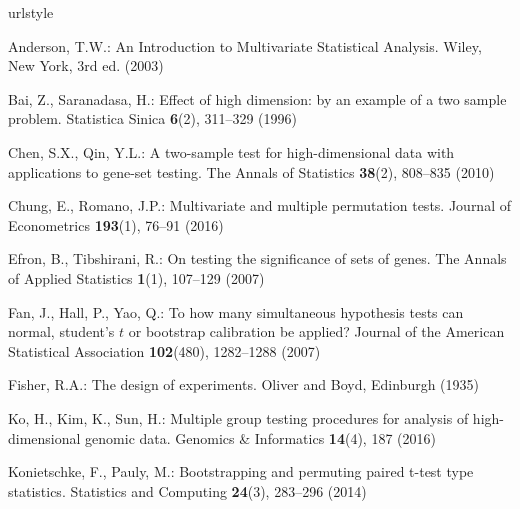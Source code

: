 \documentclass[smallcondensed,final,natbib]{svjour3}          %
\begin{document}
\begin{thebibliography}{16}
\providecommand{\natexlab}[1]{#1}
\providecommand{\url}[1]{\texttt{#1}}
\providecommand{\urlprefix}{URL }
\expandafter\ifx\csname urlstyle\endcsname\relax
  \providecommand{\doi}[1]{doi:\discretionary{}{}{}#1}\else
  \providecommand{\doi}{doi:\discretionary{}{}{}\begingroup
  \urlstyle{rm}\Url}\fi
\providecommand{\selectlanguage}[1]{\relax}

Anderson, T.W.: An Introduction to Multivariate Statistical Analysis.
\newblock Wiley, New York, 3rd ed. (2003)

Bai, Z., Saranadasa, H.: Effect of high dimension: by an example of a two
  sample problem.
\newblock Statistica Sinica \textbf{6}(2), 311--329 (1996)

Chen, S.X., Qin, Y.L.: A two-sample test for high-dimensional data with
  applications to gene-set testing.
\newblock The Annals of Statistics \textbf{38}(2), 808--835 (2010)

Chung, E., Romano, J.P.: Multivariate and multiple permutation tests.
\newblock Journal of Econometrics \textbf{193}(1), 76--91 (2016)

Efron, B., Tibshirani, R.: On testing the significance of sets of genes.
\newblock The Annals of Applied Statistics \textbf{1}(1), 107--129 (2007)

Fan, J., Hall, P., Yao, Q.: To how many simultaneous hypothesis tests can
  normal, student's $t$ or bootstrap calibration be applied?
\newblock Journal of the American Statistical Association \textbf{102}(480),
  1282--1288 (2007)

Fisher, R.A.: The design of experiments.
\newblock Oliver and Boyd, Edinburgh (1935)

Ko, H., Kim, K., Sun, H.: Multiple group testing procedures for analysis of
  high-dimensional genomic data.
\newblock Genomics {\&} Informatics \textbf{14}(4), 187 (2016)

Konietschke, F., Pauly, M.: Bootstrapping and permuting paired t-test type
  statistics.
\newblock Statistics and Computing \textbf{24}(3), 283--296 (2014)


\end{thebibliography}
\end{document}
